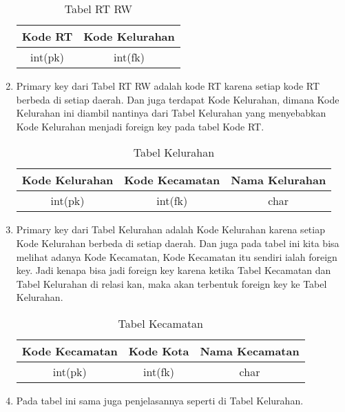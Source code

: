 \documentclass{article}
\begin{document}
\begin{enumerate}
\begin{table}[h]
\begin{center}
\begin{tabular}{|c|c|}
\hline
Kode RT & Kode Kelurahan\\
\hline
int(pk) & int(fk)\\
\hline
\end{tabular}
\caption{Tabel RT RW}
\end{center}
\end{table}
\item Primary key dari Tabel RT RW adalah kode RT karena setiap kode RT berbeda di setiap daerah. Dan juga terdapat Kode Kelurahan, dimana Kode Kelurahan ini diambil nantinya dari Tabel Kelurahan yang menyebabkan Kode Kelurahan menjadi foreign key pada tabel Kode RT.
\begin{table}[h]
\begin{center}
\begin{tabular}{|c|c|c|}
\hline
Kode Kelurahan & Kode Kecamatan & Nama Kelurahan\\
\hline
int(pk) & int(fk) & char\\
\hline
\end{tabular}
\caption{Tabel Kelurahan}
\end{center}
\end{table}
\item Primary key dari Tabel Kelurahan adalah Kode Kelurahan karena setiap Kode Kelurahan berbeda di setiap daerah. Dan juga pada tabel ini kita bisa melihat adanya Kode Kecamatan, Kode Kecamatan itu sendiri ialah foreign key. Jadi kenapa bisa jadi foreign key karena ketika Tabel Kecamatan dan Tabel Kelurahan di relasi kan, maka akan terbentuk foreign key ke Tabel Kelurahan.
\newpage
\begin{table}[h]
\begin{center}
\begin{tabular}{|c|c|c|}
\hline
Kode Kecamatan & Kode Kota & Nama Kecamatan\\
\hline
int(pk) & int(fk) & char\\
\hline
\end{tabular}
\caption{Tabel Kecamatan}
\end{center}
\end{table}
\item Pada tabel ini sama juga penjelasannya seperti di Tabel Kelurahan.
\begin{table}[h]
\begin{center}
\begin{tabular}{|c|c|c|}

\end{tabular}
\end{center}
\end{table}
\end{enumerate}
\end{document}
